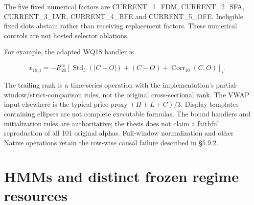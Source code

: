 \endgroup

The five fixed numerical factors are CURRENT\_\allowbreak{}1\_\allowbreak{}FDM, CURRENT\_\allowbreak{}2\_\allowbreak{}SFA,
CURRENT\_\allowbreak{}3\_\allowbreak{}LVR, CURRENT\_\allowbreak{}4\_\allowbreak{}BFE and CURRENT\_\allowbreak{}5\_\allowbreak{}OFE. Ineligible fixed slots
abstain rather than receiving replacement factors. These numerical
controls are not hosted selector ablations.

For example, the adapted WQ18 handler is

\[
x_{18,i}=-R_{20}^{\mathrm{ts}}\left[
\operatorname{Std}_5(|C-O|)+(C-O)+\operatorname{Corr}_{10}(C,O)
\right]_i.
\]

The trailing rank is a time-series operation with the implementation's
partial-window/strict-comparison rules, not the original cross-sectional
rank. The VWAP input elsewhere is the typical-price proxy \((H+L+C)/3\).
Display templates containing ellipses are not complete executable
formulas. The bound handlers and initialization rules are authoritative;
the thesis does not claim a faithful reproduction of all 101 original
alphas. Full-window normalization and other Native operations retain the
row-wise causal failure described in §5.9.2.

\section{HMMs and distinct frozen regime resources}\label{s:29b8890f9771321b}

\begingroup
\small
{}
\setlength{\tabcolsep}{3pt}

